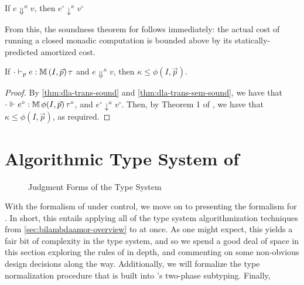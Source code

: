 \begin{theorem}
\label{thm:dla-trans-sem-sound}
If $e \Downarrow^\kappa v$, then $e^\circ \downarrow^\kappa v^\circ$
\end{theorem}

From this, the soundness theorem for \dlambdaamor follows immediately: the actual cost of running a closed monadic computation is bounded above by its statically-predicted amortized cost.

\begin{theorem}
\label{thm:dlambdaamor-sound}
If $\cdot \vdash_p e : \mathbb{M} \, (I,\vec{p}) \, \tau$ and $e \Downarrow^\kappa v$, then $\kappa \leq \phi(I,\vec{p})$.
\end{theorem}
\begin{proof}
By \autoref{thm:dla-trans-sound} and \autoref{thm:dla-trans-sem-sound}, we have that $\cdot \Vdash e^\circ  : \mathbb{M} \, \phi(I,\vec{p}) \, \tau^\circ$, and $e^\circ \downarrow^\kappa v^\circ$. Then, by Theorem 1 of \citet{rajani-et-al:popl21}, we have that $\kappa \leq \phi(I,\vec{p})$, as required.
\end{proof}



\section{Algorithmic Type System of \bilambdaamor}
\label{sec:bilambdaamor-syntax-and-types}

\begin{figure}

\caption{Judgment Forms of the \bilambdaamor Type System}
\label{fig:bilambdaamor-typing-judgments}
\end{figure}

With the formalism of \dlambdaamor under control, we move on to presenting the formalism for \bilambdaamor. In short, this entails applying all of the type system algorithmization techniques from \autoref{sec:bilambdaamor-overview} to \dlambdaamor at once. As one might expect, this yields a fair bit of complexity in the type system, and so we spend a good deal of space in this section exploring the rules of \bilambdaamor in depth, and commenting on some non-obvious design decisions along the way. Additionally, we will formalize the type normalization procedure that is built into \bilambdaamor's two-phase subtyping. Finally,

